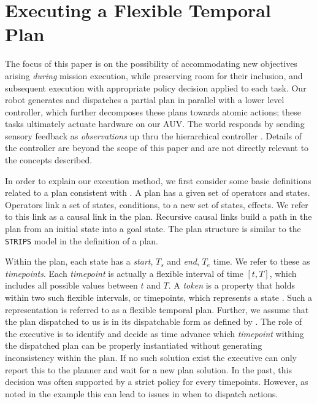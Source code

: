 \section{Executing a Flexible Temporal Plan}
\label{sec: defs}

The focus of this paper is on the possibility of accommodating new
objectives arising \emph{during} mission execution, while preserving
room for their inclusion, and subsequent execution with appropriate
policy decision applied to each task. Our robot generates and
dispatches a partial plan in parallel with a lower level controller,
which further decomposes these plans towards atomic actions; these
tasks ultimately actuate hardware on our AUV. The world responds by
sending sensory feedback as \emph{observations} up thru the
hierarchical controller \cite{mcgann08b,rajan12}. Details of the
controller are beyond the scope of this paper and are not directly
relevant to the concepts described.

In order to explain our execution method, we first consider some basic
definitions related to a plan consistent with \cite{Nau:2004}. A plan
has a given set of operators and states.  Operators link a set of
states, conditions, to a new set of states, effects. We refer to this
link as a causal link in the plan. Recursive causal links build a path
in the plan from an initial state into a goal state. The plan
structure is similar to the \texttt{STRIPS} model in the definition of
a plan.

Within the plan, each state has a {\em start}, $T_s$ and {\em end}, $T_e$ time. We
refer to these as {\em timepoints}. Each {\em timepoint} is actually a flexible
interval of time $[t, T]$, which includes all possible values between
$t$ and $T$.  A \emph{token} is a property that holds within two such
flexible intervals, or timepoints, which represents a state
\cite{py10}.  Such a representation is referred to as a flexible
temporal plan. Further, we assume that the plan dispatched to us is in
its dispatchable form as defined by \cite{mus98a}.  The role of the
executive is to identify and decide as time advance which {\em
  timepoint} withing the dispatched plan can be properly instantiated
without generating inconsistency within the plan. If no such solution
exist the executive can only report this to the planner and  wait for
a new plan solution. In the past, this decision was often supported by
a strict policy for every timepoints. However, as noted in
the example this can lead to issues in when to dispatch actions.

